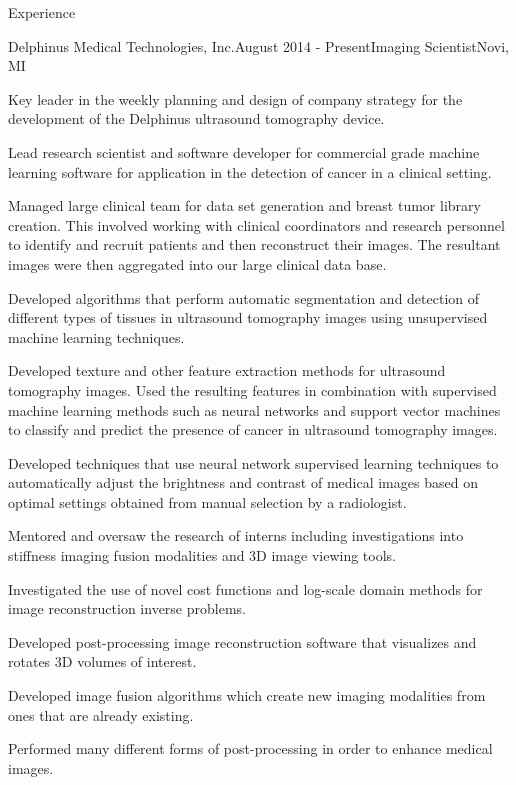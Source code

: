 \documentclass{resume} %
\begin{document}
\begin{rSection}{Experience}

\begin{rSubsection}{Delphinus Medical Technologies, Inc.}{August 2014 - Present}{Imaging Scientist}{Novi, MI}
\item Key leader in the weekly planning and design of company strategy for the development of the Delphinus ultrasound tomography device.
\item Lead research scientist and software developer for commercial grade machine learning software for application in the detection of cancer in a clinical setting.
\item Managed large clinical team for data set generation and breast tumor library creation. This involved working with clinical coordinators and research personnel to identify and recruit patients and then reconstruct their images. The resultant images were then aggregated into our large clinical data base.
\item Developed algorithms that perform automatic segmentation and detection of different types of tissues in ultrasound tomography images using unsupervised machine learning techniques.
\item Developed texture and other feature extraction methods for ultrasound tomography images. Used the resulting features in combination with supervised machine learning methods such as neural networks and support vector machines to classify and predict the presence of cancer in ultrasound tomography images.
\item Developed techniques that use neural network supervised learning techniques to automatically adjust the brightness and contrast of medical images based on optimal settings obtained from manual selection by a radiologist.
\item Mentored and oversaw the research of interns including investigations into stiffness imaging fusion modalities and 3D image viewing tools.
\item Investigated the use of novel cost functions and log-scale domain methods for image reconstruction inverse problems.
\item Developed post-processing image reconstruction software that visualizes and rotates 3D volumes of interest.
\item Developed image fusion algorithms which create new imaging modalities from ones that are already existing.
\item Performed many different forms of post-processing in order to enhance medical images.

\end{rSubsection}
\end{rSection}
\end{document}

